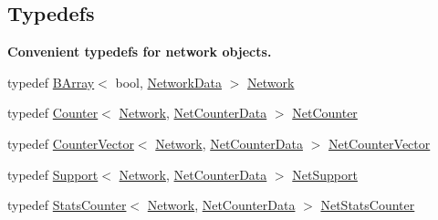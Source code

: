 \subsection*{Typedefs}
\begin{Indent}\textbf{ Convenient typedefs for network objects.}\par
\begin{DoxyCompactItemize}
\item 
typedef \hyperlink{classbarry_1_1_b_array}{B\+Array}$<$ bool, \hyperlink{classbarry_1_1counters_1_1network_1_1_network_data}{Network\+Data} $>$ \hyperlink{namespacebarry_1_1counters_1_1network_a4cb88d4572ded3b447ea269c9cd0b2c0}{Network}
\item 
typedef \hyperlink{classbarry_1_1_counter}{Counter}$<$ \hyperlink{namespacebarry_1_1counters_1_1network_a4cb88d4572ded3b447ea269c9cd0b2c0}{Network}, \hyperlink{classbarry_1_1counters_1_1network_1_1_net_counter_data}{Net\+Counter\+Data} $>$ \hyperlink{namespacebarry_1_1counters_1_1network_a067bd9de04608fc2e1586324d3864a45}{Net\+Counter}
\item 
typedef \hyperlink{classbarry_1_1_counter_vector}{Counter\+Vector}$<$ \hyperlink{namespacebarry_1_1counters_1_1network_a4cb88d4572ded3b447ea269c9cd0b2c0}{Network}, \hyperlink{classbarry_1_1counters_1_1network_1_1_net_counter_data}{Net\+Counter\+Data} $>$ \hyperlink{namespacebarry_1_1counters_1_1network_a3b3c590303d47840d1967372ae495d95}{Net\+Counter\+Vector}
\item 
typedef \hyperlink{classbarry_1_1_support}{Support}$<$ \hyperlink{namespacebarry_1_1counters_1_1network_a4cb88d4572ded3b447ea269c9cd0b2c0}{Network}, \hyperlink{classbarry_1_1counters_1_1network_1_1_net_counter_data}{Net\+Counter\+Data} $>$ \hyperlink{namespacebarry_1_1counters_1_1network_a4d30be7f465efd7d218f0264f8386b32}{Net\+Support}
\item 
typedef \hyperlink{classbarry_1_1_stats_counter}{Stats\+Counter}$<$ \hyperlink{namespacebarry_1_1counters_1_1network_a4cb88d4572ded3b447ea269c9cd0b2c0}{Network}, \hyperlink{classbarry_1_1counters_1_1network_1_1_net_counter_data}{Net\+Counter\+Data} $>$ \hyperlink{namespacebarry_1_1counters_1_1network_ae26c399917113fe280b3f2859376b8b9}{Net\+Stats\+Counter}
\end{DoxyCompactItemize}
\end{Indent}
